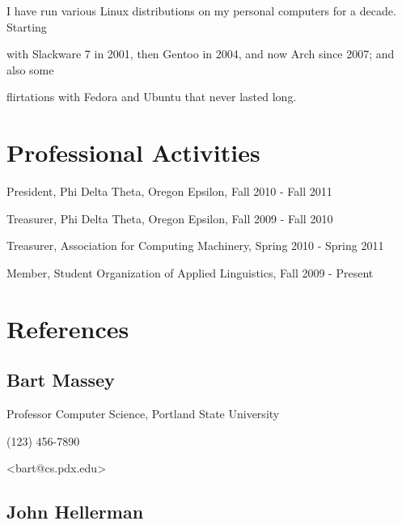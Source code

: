 \documentclass[10pt,letterpaper]{article}
\renewenvironment{itemize}{
  \begin{list}{}{
    \setlength{\leftmargin}{1.5em}
    \setlength{\itemsep}{0em}
    \setlength{\parskip}{0pt}
    \setlength{\parsep}{0em}
  }
}{
  \end{list}
}
\begin{document}
\begin{itemize}

    \item I have run various Linux distributions on my personal computers for a decade.  Starting
    \item with Slackware 7 in 2001, then Gentoo in 2004, and now Arch since 2007; and also some
    \item flirtations with Fedora and Ubuntu that never lasted long.

\end{itemize}

\section*{Professional Activities}

\begin{itemize}

	\item President, Phi Delta Theta, Oregon Epsilon, Fall 2010 - Fall 2011
	\item Treasurer, Phi Delta Theta, Oregon Epsilon, Fall 2009 - Fall 2010
	\item Treasurer, Association for Computing Machinery, Spring 2010 - Spring 2011
	\item Member, Student Organization of Applied Linguistics, Fall 2009 - Present

\end{itemize}

\pagebreak
\section*{References}

\subsection*{Bart Massey}

\begin{itemize}
	
	\item Professor Computer Science, Portland State University
	\item (123) 456-7890
	\item <bart@cs.pdx.edu>	
	
\end{itemize}

\subsection*{John Hellerman}
\end{document}
